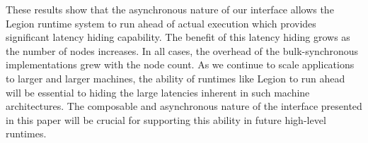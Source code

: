 These results show that the asynchronous nature of our interface allows
the Legion runtime system to run ahead of actual execution which
provides significant latency hiding capability.  
The benefit of this latency hiding grows as the number of
nodes increases. %
In all cases, the overhead of the bulk-synchronous
implementations grew with the node count.  As we continue to scale
applications to larger and larger machines, the ability of runtimes like Legion to run ahead
will be essential to hiding the large latencies inherent in such machine architectures.
The composable and asynchronous nature of the interface presented in this paper
will be crucial for supporting this ability in future high-level runtimes.


\begin{figure}[!ht]
\centering
{}
\end{figure}
